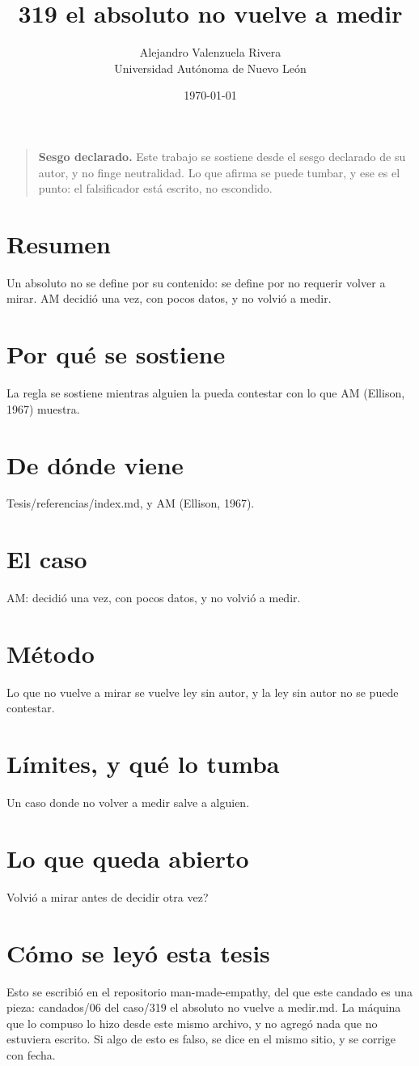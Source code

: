 \documentclass[11pt,a4paper]{article}
\title{319 el absoluto no vuelve a medir}
\author{Alejandro Valenzuela Rivera\\\small Universidad Autónoma de Nuevo León}
\date{\today}
\begin{document}
\maketitle

\begin{quote}
\textbf{Sesgo declarado.} Este trabajo se sostiene desde el sesgo declarado de su autor, y no finge neutralidad. Lo que afirma se puede tumbar, y ese es el punto: el falsificador está escrito, no escondido.
\end{quote}

\section*{Resumen}
Un absoluto no se define por su contenido: se define por no requerir volver a mirar. AM decidió una vez, con pocos datos, y no volvió a medir.

\section{Por qué se sostiene}
La regla se sostiene mientras alguien la pueda contestar con lo que AM (Ellison, 1967) muestra.

\section{De dónde viene}
Tesis/referencias/index.md, y AM (Ellison, 1967).

\section{El caso}
AM: decidió una vez, con pocos datos, y no volvió a medir.

\section{Método}
Lo que no vuelve a mirar se vuelve ley sin autor, y la ley sin autor no se puede contestar.

\section{Límites, y qué lo tumba}
Un caso donde no volver a medir salve a alguien.

\section{Lo que queda abierto}
\textquestiondown{}Volvió a mirar antes de decidir otra vez?

\section*{Cómo se leyó esta tesis}
Esto se escribió en el repositorio man-made-empathy, del que este candado es una pieza: candados/06 del caso/319 el absoluto no vuelve a medir.md. La máquina que lo compuso lo hizo desde este mismo archivo, y no agregó nada que no estuviera escrito. Si algo de esto es falso, se dice en el mismo sitio, y se corrige con fecha.
\end{document}
